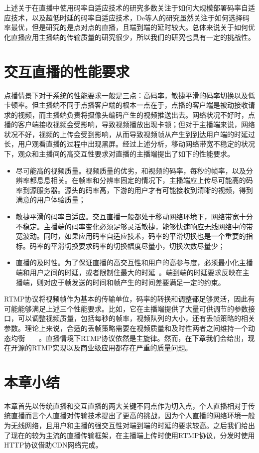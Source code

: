 上述关于在直播中使用码率自适应技术的研究多数关注于如何大规模部署码率自适应技术，以及超低时延的码率自适应技术，De等人的研究虽然关注于如何选择码率最优，但是研究的是点对点的直播，且端到端的延时较大。总体来说关于如何优化直播应用主播端的传输质量的研究很少，所以我们的研究也具有一定的挑战性。

\section{交互直播的性能要求}
点播情景下对于系统的性能要求一般是三点：高码率，敏捷平滑的码率切换以及低卡顿率。但主播端不同于点播客户端的根本一点在于，点播的客户端是被动接收请求的视频，而主播端负责将摄像头编码产生的视频推送出去。网络状况不好时，点播的客户端接收视频会受影响，导致视频播放出现卡顿；但对于主播端来说，网络状况不好，视频的上传会受到影响，从而导致视频帧从产生到到达用户端的时延过长，用户观看直播的过程中出现黑屏。经过上述分析，移动网络带宽不稳定的状况下，观众和主播间的高交互性要求对直播的主播端提出了如下的性能要求。
\begin{itemize}
  \item 尽可能高的视频质量。视频质量的优劣，和视频的码率，每秒的帧率，以及分辨率都息息相关。在帧率和分辨率固定的情况下，主播端应上传尽可能高的码率到源服务器。源头的码率高，下游的用户才有可能接收到清晰的视频，得到满意的用户体验质量；
  \item 敏捷平滑的码率自适应。交互直播一般都处于移动网络环境下，网络带宽十分不稳定。主播端的码率变化必须足够灵活敏捷，能够快速响应无线网络中的带宽波动。同时，如果应用码率自适应技术，码率的平滑切换也是一个重要的指标。码率的平滑切换要求码率的切换幅度尽量小，切换次数尽量少；
  \item 直播的及时性。为了保证直播的高交互性和用户的高参与度，必须最小化主播端和用户之间的时延，或者限制住最大的时延~\cite{yu2018impact}。端到端的时延要求反映在主播端，则对应于帧发送的时间和帧产生的时间差要满足一定的约束。
\end{itemize}

RTMP协议将视频帧作为基本的传输单位，码率的转换和调整都足够灵活，因此有可能能够满足上述三个性能要求。比如，它在主播端提供了大量可供调节的参数接口，可以调整视频质量，包括每秒的帧率，视频队列的大小，还有丢帧策略的相关参数。理论上来说，合适的丢帧策略需要在视频质量和及时性两者之间维持一个动态均衡~\cite{krasic2003quality}~\cite{singh2004dynamic}~\cite{huang2003adaptive}~\cite{fouladi2018salsify}。直播情境下RTMP协议依然是主旋律。然而，在下章我们会给出，现在开源的RTMP实现以及商业级应用都存在严重的质量问题。

\section{本章小结}
本章首先以传统直播和交互直播的两大关键不同点作为切入点，个人直播相对于传统直播而言个人直播对传输技术提出了更高的挑战，因为个人直播的网络环境一般为无线网络，且用户和主播的强交互性对端到端的时延的要求较高。之后我们给出了现在的较为主流的直播传输框架，在主播端上传时使用RTMP协议，分发时使用HTTP协议借助CDN网络完成。

